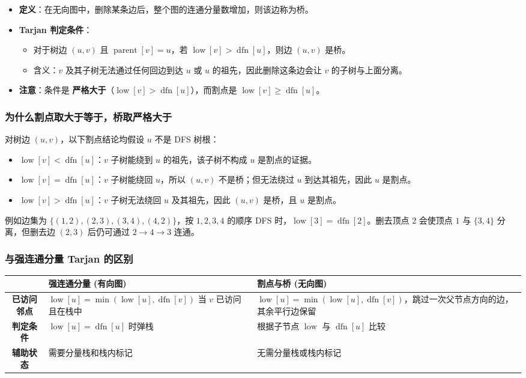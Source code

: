 \begin{itemize}
  \item \textbf{定义}：在无向图中，删除某条边后，整个图的连通分量数增加，则该边称为桥。
  \item \textbf{Tarjan 判定条件}：
    \begin{itemize}
      \item 对于树边 $(u, v)$ 且 $\operatorname{parent}[v] = u$，若 $\operatorname{low}[v] > \operatorname{dfn}[u]$，则边 $(u, v)$ 是桥。
      \item 含义：$v$ 及其子树无法通过任何回边到达 $u$ 或 $u$ 的祖先，因此删除这条边会让 $v$ 的子树与上面分离。
    \end{itemize}
  \item \textbf{注意}：条件是 \textbf{严格大于}（$\operatorname{low}[v] > \operatorname{dfn}[u]$），而割点是 $\operatorname{low}[v] \ge \operatorname{dfn}[u]$。
\end{itemize}

\subsubsection{为什么割点取大于等于，桥取严格大于}

对树边 $(u,v)$，以下割点结论均假设 $u$ 不是 DFS 树根：
\begin{itemize}
  \item $\operatorname{low}[v] < \operatorname{dfn}[u]$：$v$ 子树能绕到 $u$ 的祖先，该子树不构成 $u$ 是割点的证据。
  \item $\operatorname{low}[v] = \operatorname{dfn}[u]$：$v$ 子树能绕回 $u$，所以 $(u,v)$ 不是桥；但无法绕过 $u$ 到达其祖先，因此 $u$ 是割点。
  \item $\operatorname{low}[v] > \operatorname{dfn}[u]$：$v$ 子树无法绕回 $u$ 及其祖先，因此 $(u,v)$ 是桥，且 $u$ 是割点。
\end{itemize}

例如边集为 $\{(1,2),(2,3),(3,4),(4,2)\}$，按 $1,2,3,4$ 的顺序 DFS 时，$\operatorname{low}[3] = \operatorname{dfn}[2]$。删去顶点 $2$ 会使顶点 $1$ 与 $\{3,4\}$ 分离，但删去边 $(2,3)$ 后仍可通过 $2 \to 4 \to 3$ 连通。

\subsubsection{与强连通分量 Tarjan 的区别}

\noindent\begin{tabularx}{\textwidth}{|c|X|X|}
  \hline
  & \textbf{强连通分量 (有向图)} & \textbf{割点与桥 (无向图)} \\
  \hline
  \textbf{已访问邻点} &
  $\operatorname{low}[u] = \min(\operatorname{low}[u], \operatorname{dfn}[v])$ 当 $v$ 已访问且在栈中 &
  $\operatorname{low}[u] = \min(\operatorname{low}[u], \operatorname{dfn}[v])$，跳过一次父节点方向的边，其余平行边保留 \\
  \hline
  \textbf{判定条件} &
  $\operatorname{low}[u] = \operatorname{dfn}[u]$ 时弹栈 &
  根据子节点 $\operatorname{low}$ 与 $\operatorname{dfn}[u]$ 比较 \\
  \hline
  \textbf{辅助状态} &
  需要分量栈和栈内标记 &
  无需分量栈或栈内标记 \\
  \hline
\end{tabularx}

